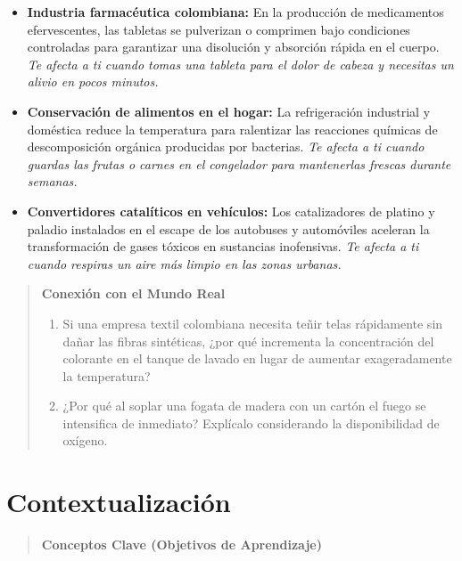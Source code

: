 \documentclass[
  spanish,
  letterpaper,
  12pt,
  oneside,
  open=any,
  DIV=15]{scrbook}
\providecommand{\tightlist}{%
  \setlength{\itemsep}{0pt}\setlength{\parskip}{0pt}}
\newcommand{\setcolorsection}[2]{%
  \definecolor{currentsectionbg}{HTML}{#1}%
  \definecolor{currentsectionborder}{HTML}{#2}%
}
\begin{document}
\begin{tcolorbox}
\begin{itemize}
\tightlist
\item
  \textbf{Industria farmacéutica colombiana:} En la producción de
  medicamentos efervescentes, las tabletas se pulverizan o comprimen
  bajo condiciones controladas para garantizar una disolución y
  absorción rápida en el cuerpo. \emph{Te afecta a ti cuando tomas una
  tableta para el dolor de cabeza y necesitas un alivio en pocos
  minutos.}
\item
  \textbf{Conservación de alimentos en el hogar:} La refrigeración
  industrial y doméstica reduce la temperatura para ralentizar las
  reacciones químicas de descomposición orgánica producidas por
  bacterias. \emph{Te afecta a ti cuando guardas las frutas o carnes en
  el congelador para mantenerlas frescas durante semanas.}
\item
  \textbf{Convertidores catalíticos en vehículos:} Los catalizadores de
  platino y paladio instalados en el escape de los autobuses y
  automóviles aceleran la transformación de gases tóxicos en sustancias
  inofensivas. \emph{Te afecta a ti cuando respiras un aire más limpio
  en las zonas urbanas.}
\end{itemize}

\begin{quote}
\textbf{Conexión con el Mundo Real}

\begin{enumerate}
\def\labelenumi{\arabic{enumi}.}
\tightlist
\item
  Si una empresa textil colombiana necesita teñir telas rápidamente sin
  dañar las fibras sintéticas, ¿por qué incrementa la concentración del
  colorante en el tanque de lavado en lugar de aumentar exageradamente
  la temperatura?
\item
  ¿Por qué al soplar una fogata de madera con un cartón el fuego se
  intensifica de inmediato? Explícalo considerando la disponibilidad de
  oxígeno.
\end{enumerate}
\end{quote}

\setcolorsection{f2c6a0}{e0b088}

\section{Contextualización}\label{contextualizaciuxf3n-7}

\begin{quote}
\textbf{Conceptos Clave (Objetivos de Aprendizaje)}


\end{quote}
\end{tcolorbox}
\end{document}
